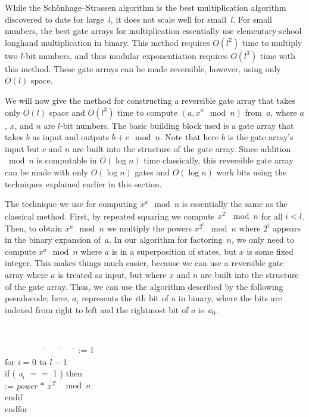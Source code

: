 While the Sch\"onhage--Strassen algorithm is the best 
multiplication algorithm discovered
to date for large~$l$, it does not scale well for small~$l$.
For small numbers, the best gate arrays for multiplication essentially use
elementary-school longhand multiplication in binary.  This method requires
$O(l^2)$ time to multiply two $l$-bit numbers, and thus modular 
exponentiation requires $O(l^3)$ time with this method.  These gate arrays 
can be made reversible, however, using only $O(l)$ space.  

We will now give the method for constructing a reversible gate array that 
takes only $O(l)$ space and $O(l^3)$ time to
compute $(a,x^a\mod{n})$ from~$a$, where $a$, $x$, and $n$
are $l$-bit numbers.  The basic building
block used is a gate array that takes $b$ as input and outputs 
$b+c\mod{n}$.  Note that here $b$ is the gate array's input but $c$ and $n$
are built into the structure of the gate array.
Since addition $\bmod{n}$ is
computable in $O(\log n)$ time classically, this reversible gate array 
can be made with only $O(\log n)$ gates and $O(\log n)$ work
bits using the techniques explained earlier in this section.

The technique we use for computing $x^a\mod{n}$ is essentially the same
as the classical method.  First, by repeated squaring we compute
$x^{2^i}\mod{n}$ for all $i < l$.  Then, to obtain $x^a\mod{n}$ we 
multiply the powers $x^{2^i}$ $\bmod{n}$
where $2^i$ appears in the binary expansion of~$a$.
In our algorithm for factoring~$n$, we only
need to compute $x^{a}\mod{n}$ where $a$ is in a superposition of states,
but $x$ is some fixed integer.  This makes things much easier,
because we can use a reversible gate array where $a$ is 
treated as input, but where $x$ and $n$ are built
into the structure of the gate array.  Thus, we can use the algorithm
described by the following pseudocode;
here, $a_i$ represents the $i$th bit of $a$ in binary, 
where the bits are indexed from right to left and the rightmost
bit of $a$ is~$a_0$.

\vspace{\baselineskip} 

\noindent
\begin{minipage}{\textwidth} %
{\tt
\begin{tabbing}
\ \ \ \ \ \ \ \ \ \= \ \ \ \ \= \ \ \ \ \= \kill
{} := 1 \\
\tab for {\it i} = 0 to {\it l}$\,-$1 \\
\tab \tab if ( {\it a}$_i$ $==$ 1 ) then \\
\tab \tab {} := {\it power} $*$ {\it x}$^{\,2^i}$ $\mod{n}$ \\
\tab \tab endif\\
\tab endfor
\end{tabbing}
}
\end{minipage}

